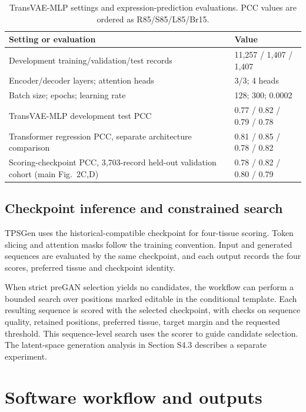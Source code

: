 \documentclass[10pt]{article}
\begin{document}
\begin{table}[htbp]
\centering
\caption{TransVAE-MLP settings and expression-prediction evaluations. PCC values are ordered as R85/S85/L85/Br15.}
\label{tab:transvae-results}
\begin{tabular}{L{0.49\textwidth}L{0.36\textwidth}}
\toprule
Setting or evaluation & Value \\
\midrule
Development training/validation/test records & 11,257 / 1,407 / 1,407 \\
Encoder/decoder layers; attention heads & 3/3; 4 heads \\
Batch size; epochs; learning rate & 128; 300; 0.0002 \\
TransVAE-MLP development test PCC & 0.77 / 0.82 / 0.79 / 0.78 \\
Transformer regression PCC, separate architecture comparison & 0.81 / 0.85 / 0.78 / 0.82 \\
Scoring-checkpoint PCC, 3,703-record held-out validation cohort (main Fig.~2C,D) & 0.78 / 0.82 / 0.80 / 0.79 \\
\bottomrule
\end{tabular}
\end{table}

\subsection{Checkpoint inference and constrained search}

TPSGen uses the historical-compatible checkpoint for four-tissue scoring. Token slicing and attention masks follow the training convention. Input and generated sequences are evaluated by the same checkpoint, and each output records the four scores, preferred tissue and checkpoint identity.

When strict preGAN selection yields no candidates, the workflow can perform a bounded search over positions marked editable in the conditional template. Each resulting sequence is scored with the selected checkpoint, with checks on sequence quality, retained positions, preferred tissue, target margin and the requested threshold. This sequence-level search uses the scorer to guide candidate selection. The latent-space generation analysis in Section S4.3 describes a separate experiment.

\section{Software workflow and outputs}
\end{document}
